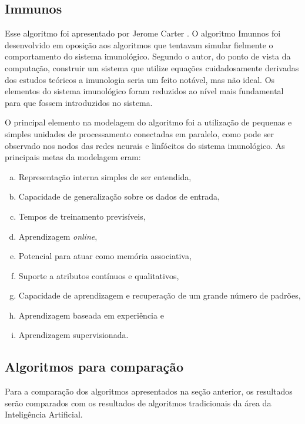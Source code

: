 \subsection{Immunos}
\label{sec:prop_immunos}

Esse algoritmo foi apresentado por Jerome Carter \cite{Carter2000}. O algoritmo Imunnos foi desenvolvido em oposição aos algoritmos que tentavam simular fielmente o comportamento do sistema imunológico. Segundo o autor, do ponto de vista da computação, construir um sistema que utilize equações cuidadosamente derivadas dos estudos teóricos a imunologia seria um feito notável, mas não ideal. Os elementos do sistema imunológico foram reduzidos ao nível mais fundamental para que fossem introduzidos no sistema.

O principal elemento na modelagem do algoritmo foi a utilização de pequenas e simples unidades de processamento conectadas em paralelo, como pode ser observado nos nodos das redes neurais e linfócitos do sistema imunológico. As principais metas da modelagem eram:

\begin{enumerate}[a)]
    \vspace{2mm}
    \itemsep1pt
    \item Representação interna simples de ser entendida,
    \item Capacidade de generalização sobre os dados de entrada,
    \item Tempos de treinamento previsíveis,
    \item Aprendizagem \emph{online},
    \item Potencial para atuar como memória associativa,
    \item Suporte a atributos contínuos e qualitativos,
    \item Capacidade de aprendizagem e recuperação de um grande número de padrões,
    \item Aprendizagem baseada em experiência e
    \item Aprendizagem supervisionada.
    \vspace{2mm}
\end{enumerate}

\subsection{Algoritmos para comparação}

Para a comparação dos algoritmos apresentados na seção anterior, os resultados serão comparados com os resultados de algoritmos tradicionais da área da Inteligência Artificial.

